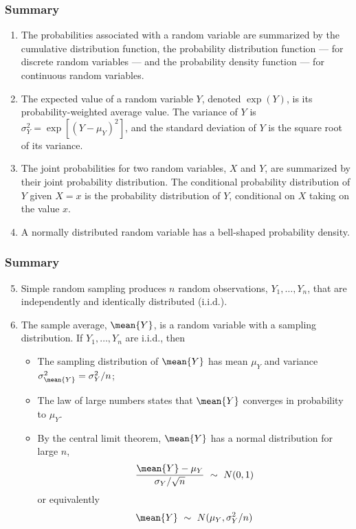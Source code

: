 

\begin{frame}
\frametitle{Summary}
\begin{enumerate}
\item The probabilities associated with a random variable are summarized by the cumulative distribution function, the probability distribution function --- for discrete random variables --- and the probability density function --- for continuous random variables.
\item The expected value of a random variable $Y$, denoted $\exp(Y)$, is its probability-weighted average value. The variance of $Y$ is $\sigma^2_{Y}=\exp[(Y-\mu_{Y})^2]$, and the standard deviation of $Y$ is the square root of its variance.
\item The joint probabilities for two random variables, $X$ and $Y$, are summarized by their joint probability distribution. The conditional probability distribution of $Y$ given $X=x$ is the probability distribution of $Y$, conditional on $X$ taking on the value $x$.
\item A normally distributed random variable has a bell-shaped probability density.
\end{enumerate}
\end{frame}


\begin{frame}
\frametitle{Summary}
\begin{enumerate}\setcounter{enumi}{4}
\item Simple random sampling produces $n$ random observations, $Y_{1},\ldots,Y_{n}$, that are independently and identically distributed (i.i.d.).
\item The sample average, $\mean{Y}$, is a random variable with a sampling distribution. If $Y_{1},\ldots,Y_{n}$ are i.i.d., then
\begin{itemize}
\item The sampling distribution of $\mean{Y}$ has mean $\mu_{Y}$ and variance $\sigma^2_{\mean{Y}}=\sigma^2_{Y}/n$;
\item The law of large numbers states that $\mean{Y}$ converges in probability to $\mu_{Y}$.
\item By the central limit theorem, $\mean{Y}$ has a normal distribution for large $n$,
\begin{align*}
\frac{\mean{Y}-\mu_{Y}}{\sigma_Y/\sqrt{n}} ~\sim~ N(0,1)
\end{align*}
or equivalently
\begin{align*}
\mean{Y} ~\sim~ N(\mu_{Y}, \sigma_Y^2/n)
\end{align*}
\end{itemize}
\end{enumerate}
\end{frame}


